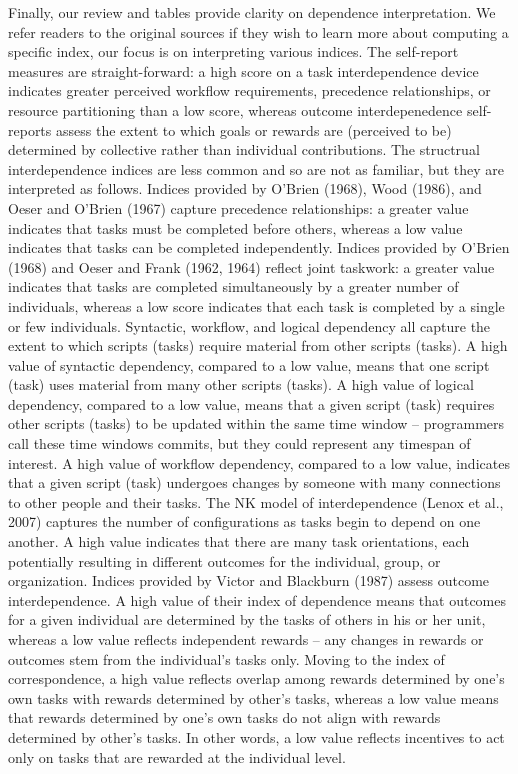 \documentclass[english,,man]{apa6}
\theoremstyle{definition}
\theoremstyle{definition}
\theoremstyle{definition}
\theoremstyle{remark}
\begin{document}
Finally, our review and tables provide clarity on dependence
interpretation. We refer readers to the original sources if they wish to
learn more about computing a specific index, our focus is on
interpreting various indices. The self-report measures are
straight-forward: a high score on a task interdependence device
indicates greater perceived workflow requirements, precedence
relationships, or resource partitioning than a low score, whereas
outcome interdepenedence self-reports assess the extent to which goals
or rewards are (perceived to be) determined by collective rather than
individual contributions. The structrual interdependence indices are
less common and so are not as familiar, but they are interpreted as
follows. Indices provided by O'Brien (1968), Wood (1986), and Oeser and
O'Brien (1967) capture precedence relationships: a greater value
indicates that tasks must be completed before others, whereas a low
value indicates that tasks can be completed independently. Indices
provided by O'Brien (1968) and Oeser and Frank (1962, 1964) reflect
joint taskwork: a greater value indicates that tasks are completed
simultaneously by a greater number of individuals, whereas a low score
indicates that each task is completed by a single or few individuals.
Syntactic, workflow, and logical dependency all capture the extent to
which scripts (tasks) require material from other scripts (tasks). A
high value of syntactic dependency, compared to a low value, means that
one script (task) uses material from many other scripts (tasks). A high
value of logical dependency, compared to a low value, means that a given
script (task) requires other scripts (tasks) to be updated within the
same time window -- programmers call these time windows commits, but
they could represent any timespan of interest. A high value of workflow
dependency, compared to a low value, indicates that a given script
(task) undergoes changes by someone with many connections to other
people and their tasks. The NK model of interdependence (Lenox et al.,
2007) captures the number of configurations as tasks begin to depend on
one another. A high value indicates that there are many task
orientations, each potentially resulting in different outcomes for the
individual, group, or organization. Indices provided by Victor and
Blackburn (1987) assess outcome interdependence. A high value of their
index of dependence means that outcomes for a given individual are
determined by the tasks of others in his or her unit, whereas a low
value reflects independent rewards -- any changes in rewards or outcomes
stem from the individual's tasks only. Moving to the index of
correspondence, a high value reflects overlap among rewards determined
by one's own tasks with rewards determined by other's tasks, whereas a
low value means that rewards determined by one's own tasks do not align
with rewards determined by other's tasks. In other words, a low value
reflects incentives to act only on tasks that are rewarded at the
individual level.
\end{document}
